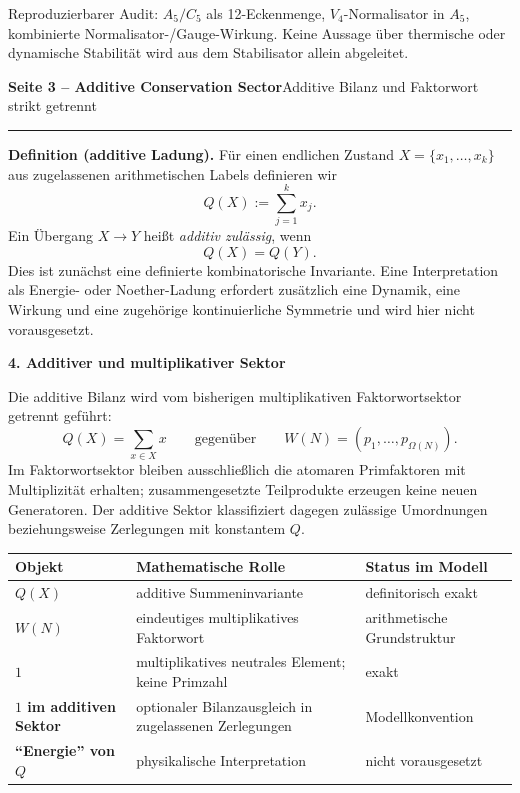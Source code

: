 \documentclass[10pt,a4paper]{article}
\begin{document}
\vfill
{\footnotesize Reproduzierbarer Audit: $A_5/C_5$ als 12-Eckenmenge, $V_4$-Normalisator in $A_5$, kombinierte Normalisator-/Gauge-Wirkung. Keine Aussage über thermische oder dynamische Stabilität wird aus dem Stabilisator allein abgeleitet.}


\newpage

{\Large\bfseries Seite 3 -- Additive Conservation Sector}\hfill{\small Additive Bilanz und Faktorwort strikt getrennt}
\vspace{2mm}
\hrule
\vspace{3mm}
\small

\begin{proofbox}
\textbf{Definition (additive Ladung).} Für einen endlichen Zustand $X=\{x_1,\dots,x_k\}$ aus zugelassenen arithmetischen Labels definieren wir
\[
Q(X):=\sum_{j=1}^{k}x_j.
\]
Ein Übergang $X\to Y$ heißt \emph{additiv zulässig}, wenn
\[
\boxed{Q(X)=Q(Y).}
\]
Dies ist zunächst eine definierte kombinatorische Invariante. Eine Interpretation als Energie- oder Noether-Ladung erfordert zusätzlich eine Dynamik, eine Wirkung und eine zugehörige kontinuierliche Symmetrie und wird hier nicht vorausgesetzt.
\end{proofbox}

\textbf{4. Additiver und multiplikativer Sektor}

Die additive Bilanz wird vom bisherigen multiplikativen Faktorwortsektor getrennt geführt:
\[
\boxed{Q(X)=\sum_{x\in X}x}
\qquad\text{gegenüber}\qquad
\boxed{W(N)=(p_1,\ldots,p_{\Omega(N)})}.
\]
Im Faktorwortsektor bleiben ausschließlich die atomaren Primfaktoren mit Multiplizität erhalten; zusammengesetzte Teilprodukte erzeugen keine neuen Generatoren. Der additive Sektor klassifiziert dagegen zulässige Umordnungen beziehungsweise Zerlegungen mit konstantem $Q$.

\begin{center}
\small
\begin{tabularx}{\textwidth}{>{\bfseries}p{3.2cm} X X}
\toprule
Objekt & Mathematische Rolle & Status im Modell\\
\midrule
$Q(X)$ & additive Summeninvariante & definitorisch exakt\\
$W(N)$ & eindeutiges multiplikatives Faktorwort & arithmetische Grundstruktur\\
$1$ & multiplikatives neutrales Element; keine Primzahl & exakt\\
$1$ im additiven Sektor & optionaler Bilanzausgleich in zugelassenen Zerlegungen & Modellkonvention\\
``Energie'' von $Q$ & physikalische Interpretation & nicht vorausgesetzt\\
\bottomrule
\end{tabularx}
\end{center}
\end{document}
